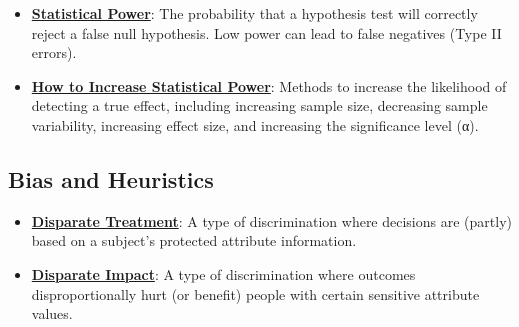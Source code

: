 \documentclass{article}%
\begin{document}
\begin{itemize}[leftmargin=*]
\item \href{https://purdue.brightspace.com/d2l/common/assets/pdfjs-d2l-dist/1.0.14-legacy/web/viewer.html?file=\%2Fcontent\%2Fenforced\%2F1095465-WL.202510.CS24200.LE1\%2F13L2-hypothesis.pdf\%3Fou\%3D1095465\&lang=en-us\&container=d2l-fileviewer-rendered-pdf\&fullscreen=d2l-fileviewer-rendered-pdf-dialog\&height=667#page=38}{\textbf{Statistical Power}}: The probability that a hypothesis test will correctly reject a false null hypothesis. Low power can lead to false negatives (Type II errors).%
\item \href{https://purdue.brightspace.com/d2l/common/assets/pdfjs-d2l-dist/1.0.14-legacy/web/viewer.html?file=\%2Fcontent\%2Fenforced\%2F1095465-WL.202510.CS24200.LE1\%2F13L2-hypothesis.pdf\%3Fou\%3D1095465\&lang=en-us\&container=d2l-fileviewer-rendered-pdf\&fullscreen=d2l-fileviewer-rendered-pdf-dialog\&height=667#page=39}{\textbf{How to Increase Statistical Power}}: Methods to increase the likelihood of detecting a true effect, including increasing sample size, decreasing sample variability, increasing effect size, and increasing the significance level (α).%
\end{itemize}

%
\subsection{Bias and Heuristics}%
\label{subsec:BiasandHeuristics}%
\begin{itemize}[leftmargin=*]%
\item \href{https://purdue.brightspace.com/d2l/common/assets/pdfjs-d2l-dist/1.0.14-legacy/web/viewer.html?file=\%2Fcontent\%2Fenforced\%2F1095465-WL.202510.CS24200.LE1\%2F25-ethics.pdf\%3Fou\%3D1095465\&lang=en-us\&container=d2l-fileviewer-rendered-pdf\&fullscreen=d2l-fileviewer-rendered-pdf-dialog\&height=667#page=17}{\textbf{Disparate Treatment}}: A type of discrimination where decisions are (partly) based on a subject's protected attribute information.%
\item \href{https://purdue.brightspace.com/d2l/common/assets/pdfjs-d2l-dist/1.0.14-legacy/web/viewer.html?file=\%2Fcontent\%2Fenforced\%2F1095465-WL.202510.CS24200.LE1\%2F25-ethics.pdf\%3Fou\%3D1095465\&lang=en-us\&container=d2l-fileviewer-rendered-pdf\&fullscreen=d2l-fileviewer-rendered-pdf-dialog\&height=667#page=17}{\textbf{Disparate Impact}}: A type of discrimination where outcomes disproportionally hurt (or benefit) people with certain sensitive attribute values.%
\end{itemize}
\end{document}
